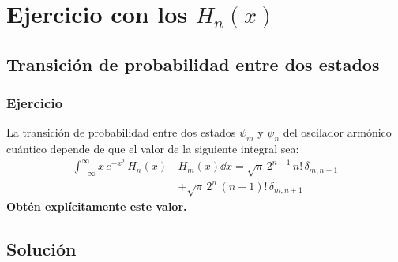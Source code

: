 \documentclass[12pt]{beamer}
\begin{document}
\section{Ejercicio con los \texorpdfstring{$H_{n}(x)$}{Hn(x)}}
\subsection{Transición de probabilidad entre dos estados}

\begin{frame}
\frametitle{Ejercicio}
La transición de probabilidad entre dos estados $\psi_{m}$ y $\psi_{n}$ del oscilador armónico cuántico depende de que el valor de la siguiente integral sea:
\begin{align*}
\int_{-\infty}^{\infty} x \, e^{-x^{2}} \, H_{n}(x) \, &H_{m}(x) \dd{x} = \sqrt{\pi} \, 2^{n-1} \, n! \, \delta_{m,n-1} \\[1em]
&+ \sqrt{\pi} \, 2^{n} \, (n+1)! \, \delta_{m,n+1}
\end{align*}
\pause
\textbf{Obtén explícitamente este valor.}
\end{frame}

\subsection{Solución}
\end{document}
